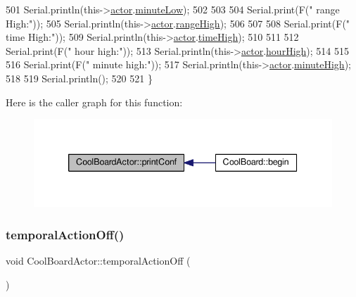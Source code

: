 \begin{DoxyCode}
501     Serial.println(this->\hyperlink{class_cool_board_actor_a8f190db9f7a39fddbcef7f152da970e9}{actor}.\hyperlink{struct_cool_board_actor_1_1state_acbcc2902331fd9d757cd475eb403bdd9}{minuteLow});
502 
503 
504     Serial.print(F(\textcolor{stringliteral}{" range High:"}));
505     Serial.println(this->\hyperlink{class_cool_board_actor_a8f190db9f7a39fddbcef7f152da970e9}{actor}.\hyperlink{struct_cool_board_actor_1_1state_a6e5cd6c5cd44e2decfd8d4df1853f8e3}{rangeHigh});
506 
507 
508     Serial.print(F(\textcolor{stringliteral}{" time High:"}));
509     Serial.println(this->\hyperlink{class_cool_board_actor_a8f190db9f7a39fddbcef7f152da970e9}{actor}.\hyperlink{struct_cool_board_actor_1_1state_a54cd4976b56aeaa6274fe0576aaebb0f}{timeHigh});
510 
511 
512     Serial.print(F(\textcolor{stringliteral}{" hour high:"}));
513     Serial.println(this->\hyperlink{class_cool_board_actor_a8f190db9f7a39fddbcef7f152da970e9}{actor}.\hyperlink{struct_cool_board_actor_1_1state_acd1af3ac2382258a5b05497d814adc01}{hourHigh});
514 
515 
516     Serial.print(F(\textcolor{stringliteral}{" minute high:"}));
517     Serial.println(this->\hyperlink{class_cool_board_actor_a8f190db9f7a39fddbcef7f152da970e9}{actor}.\hyperlink{struct_cool_board_actor_1_1state_a4bff3d61ead74adb60be224764b93006}{minuteHigh});
518 
519     Serial.println(); 
520 
521 \}
\end{DoxyCode}
Here is the caller graph for this function\+:\nopagebreak
\begin{figure}[H]
\begin{center}
\leavevmode
\includegraphics[width=339pt]{dc/d69/class_cool_board_actor_aabb10e7aebc3249ffc940530de29f84a_icgraph}
\end{center}
\end{figure}
\mbox{\label{class_cool_board_actor_a02698bd647df49cabbe74513d4d88918}} 
\subsubsection{\texorpdfstring{temporal\+Action\+Off()}{temporalActionOff()}}
{\footnotesize\ttfamily void Cool\+Board\+Actor\+::temporal\+Action\+Off (\begin{DoxyParamCaption}{ }\end{DoxyParamCaption})}

